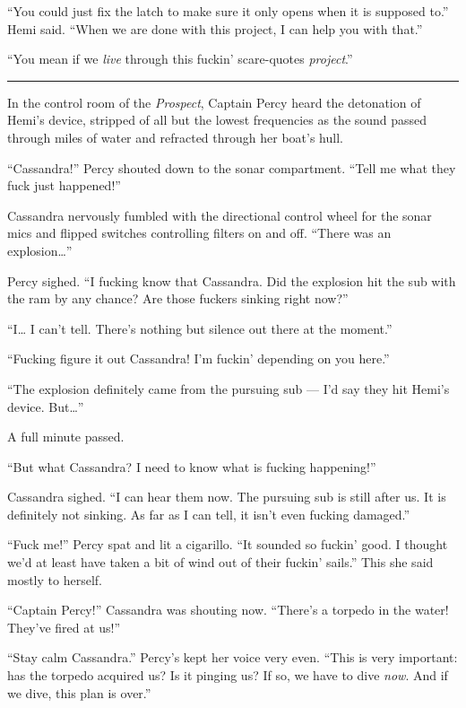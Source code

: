 \documentclass[
]{scrbook}
\begin{document}
``You could just fix the latch to make sure it only opens when it is
supposed to.'' Hemi said. ``When we are done with this project, I can
help you with that.''

``You mean if we \emph{live} through this fuckin' scare-quotes
\emph{project}.''

\begin{center}\rule{0.5\linewidth}{0.5pt}\end{center}

In the control room of the \emph{Prospect}, Captain Percy heard the
detonation of Hemi's device, stripped of all but the lowest frequencies
as the sound passed through miles of water and refracted through her
boat's hull.

``Cassandra!'' Percy shouted down to the sonar compartment. ``Tell me
what they fuck just happened!''

Cassandra nervously fumbled with the directional control wheel for the
sonar mics and flipped switches controlling filters on and off. ``There
was an explosion\ldots{}''

Percy sighed. ``I fucking know that Cassandra. Did the explosion hit the
sub with the ram by any chance? Are those fuckers sinking right now?''

``I\ldots{} I can't tell. There's nothing but silence out there at the
moment.''

``Fucking figure it out Cassandra! I'm fuckin' depending on you here.''

``The explosion definitely came from the pursuing sub --- I'd say they
hit Hemi's device. But\ldots{}''

A full minute passed.

``But what Cassandra? I need to know what is fucking happening!''

Cassandra sighed. ``I can hear them now. The pursuing sub is still after
us. It is definitely not sinking. As far as I can tell, it isn't even
fucking damaged.''

``Fuck me!'' Percy spat and lit a cigarillo. ``It sounded so fuckin'
good. I thought we'd at least have taken a bit of wind out of their
fuckin' sails.'' This she said mostly to herself.

``Captain Percy!'' Cassandra was shouting now. ``There's a torpedo in
the water! They've fired at us!''

``Stay calm Cassandra.'' Percy's kept her voice very even. ``This is
very important: has the torpedo acquired us? Is it pinging us? If so, we
have to dive \emph{now}. And if we dive, this plan is over.''
\end{document}
